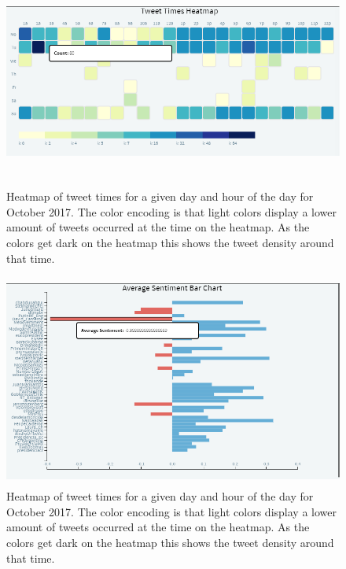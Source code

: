 \documentclass[journal]{vgtc}                %
\begin{document}
\begin{figure}[tb]
 \centering %
 \includegraphics[height=7cm,width=\columnwidth, keepaspectratio]{imgs/heatmap.png}
 \caption{Heatmap of tweet times for a given day and hour of the day for October 2017. The color encoding is that light colors display a lower amount of tweets occurred at the time on the heatmap. As the colors get dark on the heatmap this shows the tweet density around that time. }
 \label{fig:hmap}
\end{figure}

\begin{figure}[tb]
 \centering %
 \includegraphics[height=7cm,width=\columnwidth, keepaspectratio]{imgs/sentiment.png}
 \caption{Heatmap of tweet times for a given day and hour of the day for October 2017. The color encoding is that light colors display a lower amount of tweets occurred at the time on the heatmap. As the colors get dark on the heatmap this shows the tweet density around that time. }
 \label{fig:sent}
\end{figure}
\end{document}

